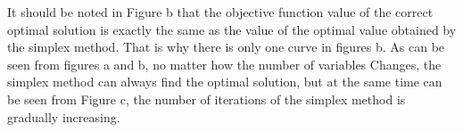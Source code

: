 It should be noted in Figure b that the objective function value of the correct optimal solution is exactly the same as the value of the optimal value obtained by the simplex method. That is why there is only one curve in figures b. As can be seen from figures a and b, no matter how the number of variables Changes, the simplex method can always find the optimal solution, but at the same time can be seen from Figure c, the number of iterations of the simplex method is gradually increasing.
\newpage
